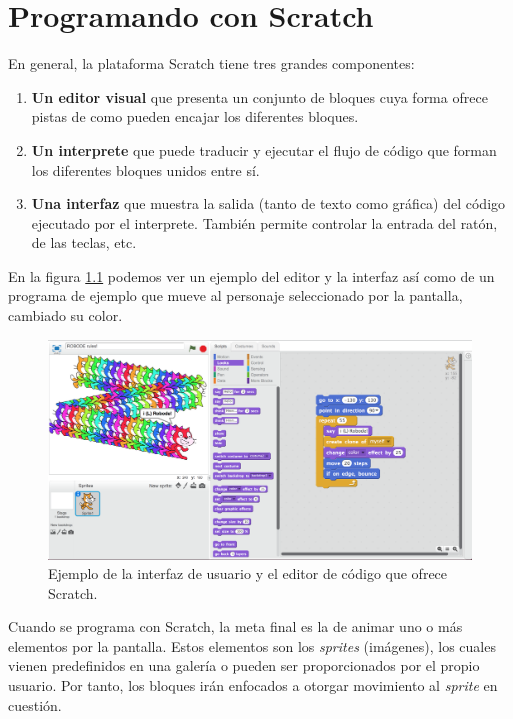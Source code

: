 \chapter{Programando con Scratch}
\label{anexo:scratch-funcionamiento}

En general, la plataforma Scratch tiene tres grandes componentes:
\begin{enumerate}
	\item \textbf{Un editor visual} que presenta un conjunto de bloques cuya forma ofrece pistas de como pueden encajar los diferentes bloques.
	\item \textbf{Un interprete} que puede traducir y ejecutar el flujo de código que forman los diferentes bloques unidos entre sí.
	\item \textbf{Una interfaz} que muestra la salida (tanto de texto como gráfica) del código ejecutado por el interprete. También permite controlar la entrada del ratón, de las teclas, etc.
\end{enumerate}

En la figura \ref{fig:scratch-example} podemos ver un ejemplo del editor y la interfaz así como de un programa de ejemplo que mueve al personaje seleccionado por la pantalla, cambiado su color.

\begin{figure}[!ht]
	\begin{centering}
		\includegraphics[width=1\textwidth]{images/scratch-example.png}
			\caption{Ejemplo de la interfaz de usuario y el editor de código que ofrece Scratch.}
				\label{fig:scratch-example}
	\end{centering}
\end{figure}

Cuando se programa con Scratch, la meta final es la de animar uno o más elementos por la pantalla. Estos elementos son los \emph{sprites} (imágenes), los cuales vienen predefinidos en una galería o pueden ser proporcionados por el propio usuario. Por tanto, los bloques irán enfocados a otorgar movimiento al \emph{sprite} en cuestión.

